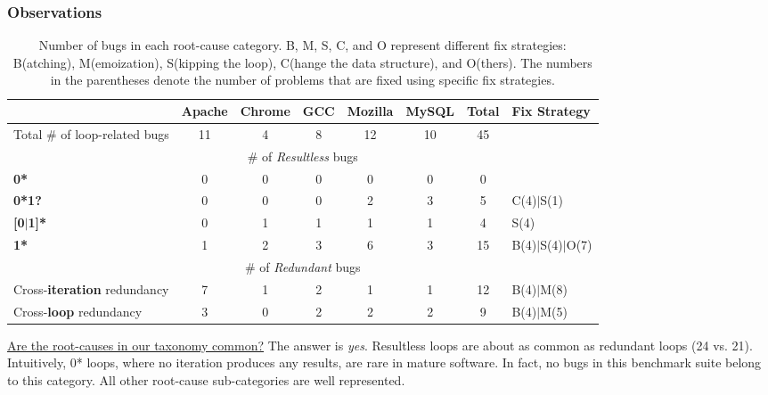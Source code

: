 \subsubsection{Observations}
\label{sec:6_study_ob}
\begin{table*}[tb!]
\begin{adjustwidth}{-.5in}{-.5in}
\scriptsize
\centering
{
\begin{tabular}{lccccccl}
\toprule
&Apache&Chrome&GCC&Mozilla&MySQL&Total&Fix Strategy\\
\midrule
Total \# of loop-related bugs & 11 & 4 & 8 & 12 & 10 & 45 &  \\
\midrule
\multicolumn{8}{c}{\# of {\textit {Resultless}} bugs}\\
\multicolumn{1}{l}{ {\bf 0*} }
&0&0&0&0&0&0&\\
\multicolumn{1}{l}{ {\bf 0*1?} }
&0&0&0&2&3&5&C(4)$|$S(1)\\
\multicolumn{1}{l}{{\bf [0$|$1]*}}
&0&1&1&1&1&4&S(4)\\
\multicolumn{1}{l}{{\bf 1*}}
&1&2&3&6&3&15& B(4)$|$S(4)$|$O(7)\\
\midrule
\multicolumn{8}{c}{ \# of {\textit {Redundant}} bugs}\\
\multicolumn{1}{l}{Cross-{\bf iteration} redundancy}
&7&1&2&1&1&12&B(4)$|$M(8)\\
\multicolumn{1}{l}{ Cross-{\bf loop} redundancy}
&3&0&2&2&2&9&B(4)$|$M(5)\\
\bottomrule
\end{tabular}
}
\end{adjustwidth}
\caption{Number of bugs in each root-cause category. 
B, M, S, C, and O represent different fix strategies:
B(atching),  
M(emoization), 
S(kipping the loop),
C(hange the data structure), and O(thers). The numbers in the 
parentheses denote the number of problems that are fixed using specific
fix strategies.}
\label{tab:6_root}
\end{table*}



\underline{Are the root-causes in our taxonomy common?}
The answer is \textit{yes}.
Resultless loops are about as common as redundant loops
(24 vs. 21).
Intuitively, 0* loops, where no iteration produces any results,
are rare in mature software. In fact, no bugs in this
benchmark suite belong to this category.
All other root-cause sub-categories are well represented.


